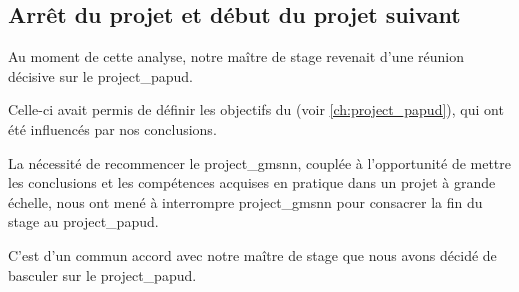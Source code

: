 \subsection{Arrêt du projet et début du projet suivant}
Au moment de cette analyse, notre maître de stage revenait d'une réunion décisive sur le \gls{project_papud}.

Celle-ci avait permis de définir les objectifs du  (voir \autoref{ch:project_papud}), qui ont été influencés par nos conclusions.

La nécessité de recommencer le \gls{project_gmsnn}, couplée à l'opportunité de mettre les conclusions et les compétences acquises en pratique dans un projet à grande échelle, nous ont mené à interrompre \gls{project_gmsnn} pour consacrer la fin du stage au \gls{project_papud}.

C'est d'un commun accord avec notre maître de stage que nous avons décidé de basculer sur le \gls{project_papud}.